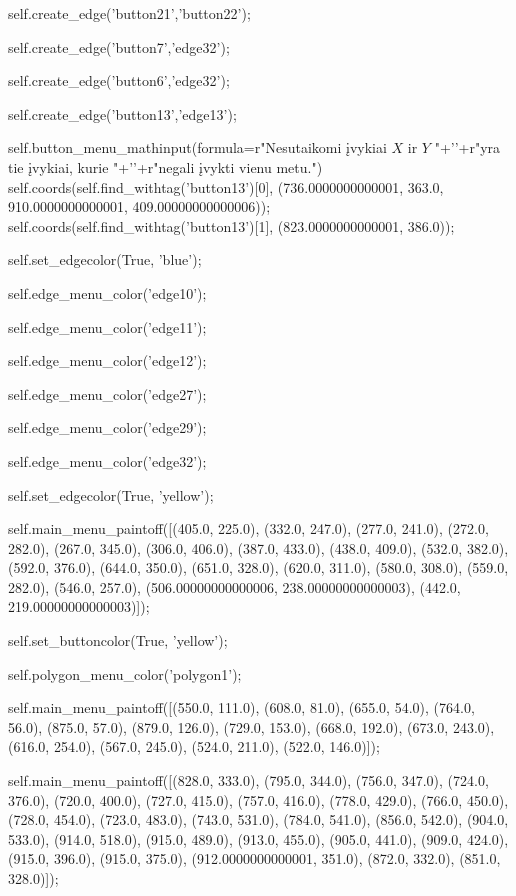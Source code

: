 self.create_edge('button21','button22');

self.create_edge('button7','edge32');

self.create_edge('button6','edge32');

self.create_edge('button13','edge13');

self.button_menu_mathinput(formula=r"Nesutaikomi įvykiai $X$ ir $Y$ "+'\n'+r"yra tie įvykiai, kurie "+'\n'+r"negali įvykti vienu metu.")
self.coords(self.find_withtag('button13')[0], (736.0000000000001, 363.0, 910.0000000000001, 409.00000000000006));
self.coords(self.find_withtag('button13')[1], (823.0000000000001, 386.0));

self.set_edgecolor(True, 'blue');

self.edge_menu_color('edge10');

self.edge_menu_color('edge11');

self.edge_menu_color('edge12');

self.edge_menu_color('edge27');

self.edge_menu_color('edge29');

self.edge_menu_color('edge32');

self.set_edgecolor(True, 'yellow');

self.main_menu_paintoff([(405.0, 225.0), (332.0, 247.0), (277.0, 241.0), (272.0, 282.0), (267.0, 345.0), (306.0, 406.0), (387.0, 433.0), (438.0, 409.0), (532.0, 382.0), (592.0, 376.0), (644.0, 350.0), (651.0, 328.0), (620.0, 311.0), (580.0, 308.0), (559.0, 282.0), (546.0, 257.0), (506.00000000000006, 238.00000000000003), (442.0, 219.00000000000003)]);

self.set_buttoncolor(True, 'yellow');

self.polygon_menu_color('polygon1');

self.main_menu_paintoff([(550.0, 111.0), (608.0, 81.0), (655.0, 54.0), (764.0, 56.0), (875.0, 57.0), (879.0, 126.0), (729.0, 153.0), (668.0, 192.0), (673.0, 243.0), (616.0, 254.0), (567.0, 245.0), (524.0, 211.0), (522.0, 146.0)]);

self.main_menu_paintoff([(828.0, 333.0), (795.0, 344.0), (756.0, 347.0), (724.0, 376.0), (720.0, 400.0), (727.0, 415.0), (757.0, 416.0), (778.0, 429.0), (766.0, 450.0), (728.0, 454.0), (723.0, 483.0), (743.0, 531.0), (784.0, 541.0), (856.0, 542.0), (904.0, 533.0), (914.0, 518.0), (915.0, 489.0), (913.0, 455.0), (905.0, 441.0), (909.0, 424.0), (915.0, 396.0), (915.0, 375.0), (912.0000000000001, 351.0), (872.0, 332.0), (851.0, 328.0)]);


